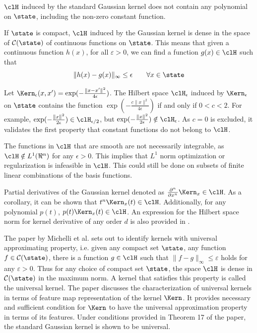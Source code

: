 \begin{arabnum}
	\item $\clH$ induced by the standard Gaussian kernel does not contain any polynomial on $\state$, including the non-zero constant function. 
	
	\item If $\state$ is compact, $\clH$ induced by the Gaussian kernel is dense in the space of $\mathcal{C}(\state)$ of continuous functions on $\state$.
	This means that given a continuous function $h(x)$, for all $\varepsilon >0$, we can find a function $g(x) \in \clH$ such that 
	\begin{equation}
	\|h(x) - g(x)\|_\infty \leq \epsilon \qquad \forall x \in \state
	\end{equation} 
	\item Let $\Kern_{\epsilon}(x,x') = \exp(-\frac{\|x-x'\|^2}{4\epsilon})$. The Hilbert space $\clH_\epsilon$ induced by $\Kern_\epsilon$ on $\state$ contains the function $\exp(-\frac{c \|x\|^2} {4 \epsilon})$ if and only if $0<c <2$. For example, $\exp(-\frac{\|x\|^2}{2 \epsilon}) \in \clH_{\epsilon/2}$, but  $\exp(-\frac{\|x\|^2}{2 \epsilon}) \notin \clH_{\epsilon}$. As $c=0$ is excluded, it validates the first property that constant functions do not belong to $\clH$.
	
	\item The functions in $\clH$ that are smooth are not necessarily integrable, as $\clH \notin L^1(\Re^n)$ for any $\epsilon >0$.  This implies that $L^1$ norm optimization or regularization is infeasible in $\clH$. This could still be done on subsets of finite linear combinations of the basis functions.
	
	
	\item Partial derivatives of the Gaussian kernel denoted as $\frac{\partial^n}{\partial x^n} \Kern_x \in \clH$. As a corollary, it can be shown that $t^n \Kern_x(t)\in\clH$. Additionally, for any polynomial $p(t)$, $p(t) \Kern_x(t) \in \clH$. An expression for the Hilbert space norm for kernel derivative of any order $d$ is also provided in \cite{min10}. 
\end{arabnum}

The paper by Michelli et al. \cite{micchaxuzha06} sets out to identify kernels with universal approximating property, i.e. given any compact set $\state$, any function $f \in \mathcal{C}(\state)$, there is a function $g \in \clH$ such that $\| f - g\|_{\infty} \leq \varepsilon$ holds for any $\varepsilon > 0$. Thus for any choice of compact set $\state$, the space $\clH$ is dense in $\mathcal{C}(\state)$ in the maximum norm. A kernel that satisfies this property is called the universal kernel. The paper discusses the characterization of universal kernels in terms of feature map representation of the kernel $\Kern$. It provides necessary and sufficient condition for $\Kern$ to have the universal approximation property in terms of its features. Under conditions provided in Theorem 17 of the paper, the standard Gaussian kernel is shown to be universal. 
